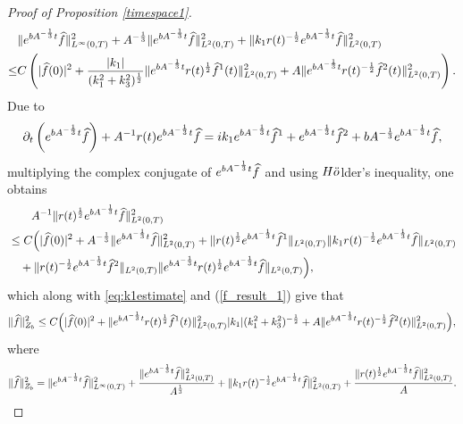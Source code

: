 \documentclass[12pt, reqno]{amsart}
\numberwithin{equation}{section}
\begin{document}
\begin{proof}[Proof of Proposition \ref{timespace1}]
\begin{equation}
\begin{aligned}
				&\|{\rm e}^{bA^{-\frac13 }t}\widehat{f}\|_{L^{\infty}(0,T)}^2+
				A^{-\frac{1}{3}}\|{\rm e}^{bA^{-\frac13 }t}\widehat{f}\|_{L^{2}(0,T)}^2+
				\|k_1r(t)^{-\frac{1}{2}}{\rm e}^{bA^{-\frac13 }t}\widehat{f}\|_{L^2(0,T)}^2
				\\ \leq& C\left(|\widehat{f}(0)|^2
				+\frac{|k_{1}|}{(k_{1}^{2}+k_{3}^{2})^{\frac12}}\|{\rm e}^{bA^{-\frac{1}{3}}t}r(t)^{\frac{1}{2}}\widehat{f}^1(t)\|^2_{L^2(0,T)}
				+A\|{\rm e}^{bA^{-\frac13 }t}
				r(t)^{-\frac{1}{2}}\widehat{f}^2(t)\|^2_{L^2(0,T)}\right).
			\end{aligned}
		\end{equation}
		Due to 
		\begin{equation*}
			\partial_t\left({\rm e}^{bA^{-\frac13 }t}\widehat{f}\right)+A^{-1} r(t){\rm e}^{bA^{-\frac13 }t}\widehat{f}={ik_1}{\rm e}^{bA^{-\frac13 }t}\widehat{f}^1+{\rm e}^{bA^{-\frac13 }t}\widehat{f}^2+bA^{-\frac{1}{3}}{\rm e}^{bA^{-\frac13 }t}\widehat{f},
		\end{equation*}
		multiplying the complex conjugate of ${\rm e}^{bA^{-\frac13 }t}\widehat{f}$ and using $\rm H\ddot{o}$lder's inequality,  one obtains 
		\begin{equation*}
			\begin{aligned}
				&\quad \quad A^{-1} \|r(t)^{\frac12}{\rm e}^{bA^{-\frac13 }t}\widehat{f}\|^2_{L^2(0,T)}\\
				&\leq 
				C\Big(|\widehat{f}(0)|^2+A^{-\frac{1}{3}}\|{\rm e}^{bA^{-\frac13 }t}\widehat{f}\|^2_{L^2(0,T)}+\|r(t)^{\frac12}{\rm e}^{bA^{-\frac13 }t}\widehat{f}^1\|_{L^2(0,T)}
				\|{k_1}r(t)^{-\frac12}{\rm e}^{bA^{-\frac13 }t}\widehat{f}\|_{L^2(0,T)}\\
				&\quad 
				+\|r(t)^{-\frac12}{\rm e}^{bA^{-\frac13 }t}\widehat{f}^2\|_{L^2(0,T)}
				\|e^{bA^{-\frac13}t}r(t)^{\frac12}{\rm e}^{bA^{-\frac13 }t}\widehat{f}\|_{L^2(0,T)}
				\Big),
			\end{aligned}
		\end{equation*}
		which along with \eqref{eq:k1estimate} and (\ref{f_result_1}) give that 
		\begin{equation}\label{f_result_2}
			\begin{aligned}
				\|\widehat{f}\|^2_{Z_b}\leq C\Big(|\widehat{f}(0)|^2
				+\|{\rm e}^{bA^{-\frac{1}{3}}t}r(t)^{\frac{1}{2}}\widehat{f}^1(t)\|^2_{L^2(0,T)}{|k_1|(k_1^2+k_3^2)^{-\frac{1}{2}}}
				+A\|{\rm e}^{bA^{-\frac13 }t}
				r(t)^{-\frac{1}{2}}\widehat{f}^2(t)\|^2_{L^2(0,T)}\Big),
			\end{aligned}
		\end{equation}
		where  $$\|\widehat{f}\|^2_{Z_b}=
		\|{\rm e}^{bA^{-\frac13 }t}\widehat{f}\|_{L^{\infty}(0,T)}^2+
		\frac{\|{\rm e}^{bA^{-\frac13 }t}\widehat{f}\|_{L^{2}(0,T)}^2}{A^{\frac13}}+
		\|k_1r(t)^{-\frac{1}{2}}{\rm e}^{bA^{-\frac13 }t}\widehat{f}\|_{L^2(0,T)}^2
		+\frac{\|r(t)^{\frac12}{\rm e}^{bA^{-\frac13 }t}\widehat{f}\|^2_{L^2(0,T)}}{A}.$$
		

\end{proof}
\end{document}
